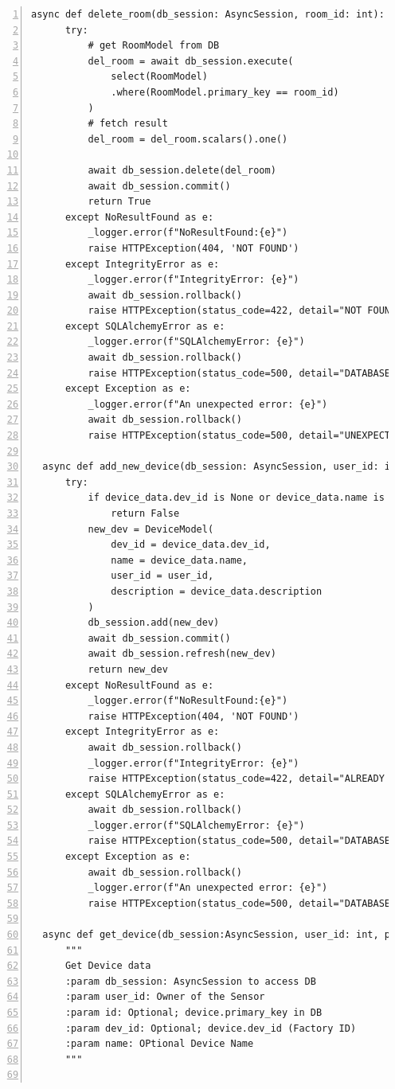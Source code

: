 \documentclass[12pt, letterpaper]{article}
\begin{document}
\begin{lstlisting}[frame=single, style=py, numbers=left, label={lst:dbqueries}, caption={db: queries.py}]
  async def delete_room(db_session: AsyncSession, room_id: int):
      try:
          # get RoomModel from DB
          del_room = await db_session.execute(
              select(RoomModel)
              .where(RoomModel.primary_key == room_id)
          )
          # fetch result
          del_room = del_room.scalars().one()
  
          await db_session.delete(del_room)
          await db_session.commit()
          return True
      except NoResultFound as e:
          _logger.error(f"NoResultFound:{e}")
          raise HTTPException(404, 'NOT FOUND')
      except IntegrityError as e:
          _logger.error(f"IntegrityError: {e}")
          await db_session.rollback()
          raise HTTPException(status_code=422, detail="NOT FOUND")
      except SQLAlchemyError as e:
          _logger.error(f"SQLAlchemyError: {e}")
          await db_session.rollback()
          raise HTTPException(status_code=500, detail="DATABASE ERROR")
      except Exception as e:
          _logger.error(f"An unexpected error: {e}")
          await db_session.rollback()
          raise HTTPException(status_code=500, detail="UNEXPECTED DATABASE ERROR")
      
  async def add_new_device(db_session: AsyncSession, user_id: int, device_data):
      try:
          if device_data.dev_id is None or device_data.name is None or user_id is None:
              return False
          new_dev = DeviceModel(
              dev_id = device_data.dev_id,
              name = device_data.name,
              user_id = user_id,
              description = device_data.description
          )
          db_session.add(new_dev)
          await db_session.commit()
          await db_session.refresh(new_dev)
          return new_dev
      except NoResultFound as e:
          _logger.error(f"NoResultFound:{e}")
          raise HTTPException(404, 'NOT FOUND')
      except IntegrityError as e:
          await db_session.rollback()
          _logger.error(f"IntegrityError: {e}")
          raise HTTPException(status_code=422, detail="ALREADY EXISTS")
      except SQLAlchemyError as e:
          await db_session.rollback()
          _logger.error(f"SQLAlchemyError: {e}")
          raise HTTPException(status_code=500, detail="DATABASE ERROR")
      except Exception as e:
          await db_session.rollback()
          _logger.error(f"An unexpected error: {e}")
          raise HTTPException(status_code=500, detail="DATABASE ERROR")
      
  async def get_device(db_session:AsyncSession, user_id: int, primary_key: int = None, dev_id: str = None, name: str = None):
      """
      Get Device data
      :param db_session: AsyncSession to access DB
      :param user_id: Owner of the Sensor
      :param id: Optional; device.primary_key in DB
      :param dev_id: Optional; device.dev_id (Factory ID)
      :param name: OPtional Device Name
      """
      

\end{lstlisting}
\end{document}
